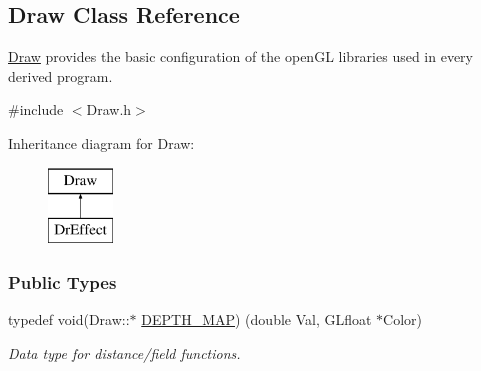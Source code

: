 \hypertarget{classDraw}{}\subsection{Draw Class Reference}
\label{classDraw}


\hyperlink{classDraw}{Draw} provides the basic configuration of the open\+GL libraries used in every derived program.  




{\ttfamily \#include $<$Draw.\+h$>$}

Inheritance diagram for Draw\+:\begin{figure}[H]
\begin{center}
\leavevmode
\includegraphics[height=2.000000cm]{classDraw}
\end{center}
\end{figure}
\subsubsection*{Public Types}
\begin{DoxyCompactItemize}
\item 
typedef void(Draw\+::$\ast$ \hyperlink{classDraw_a667fca5fb3b2ab1229ca1043c733a765}{D\+E\+P\+T\+H\+\_\+\+M\+AP}) (double Val, G\+Lfloat $\ast$Color)\hypertarget{classDraw_a667fca5fb3b2ab1229ca1043c733a765}{}\label{classDraw_a667fca5fb3b2ab1229ca1043c733a765}

\begin{DoxyCompactList}\small\item\em Data type for distance/field functions. \end{DoxyCompactList}\end{DoxyCompactItemize}
